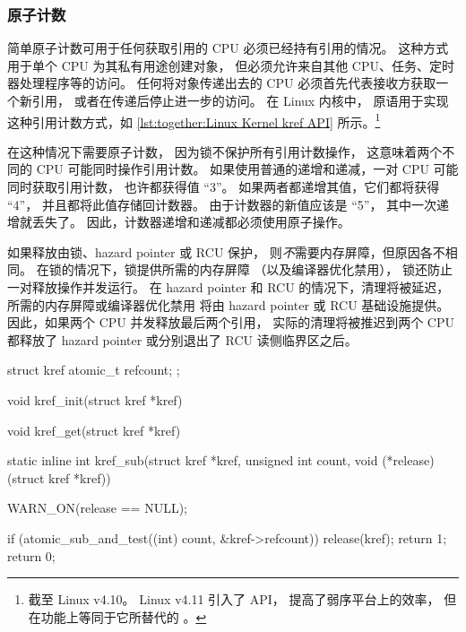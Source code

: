 \subsubsection{原子计数}
\label{sec:together:Atomic Counting}

简单原子计数可用于任何获取引用的 CPU
必须已经持有引用的情况。
这种方式用于单个 CPU 为其私有用途创建对象，
但必须允许来自其他 CPU、任务、定时器处理程序等的访问。
任何将对象传递出去的 CPU 必须首先代表接收方获取一个新引用，
或者在传递后停止进一步的访问。
在 Linux 内核中， 原语用于实现
这种引用计数方式，如
\cref{lst:together:Linux Kernel kref API} 所示。\footnote{
	截至 Linux v4.10。
	Linux v4.11 引入了  API，
	提高了弱序平台上的效率，
	但在功能上等同于它所替代的 。}

在这种情况下需要原子计数，
因为锁不保护所有引用计数操作，
这意味着两个不同的 CPU 可能同时操作引用计数。
如果使用普通的递增和递减，一对 CPU 可能同时获取引用计数，
也许都获得值 ``3''。
如果两者都递增其值，它们都将获得 ``4''，
并且都将此值存储回计数器。
由于计数器的新值应该是 ``5''，
其中一次递增就丢失了。
因此，计数器递增和递减都必须使用原子操作。

如果释放由锁、hazard pointer 或 RCU 保护，
则\emph{不}需要内存屏障，但原因各不相同。
在锁的情况下，锁提供所需的内存屏障
（以及编译器优化禁用），
锁还防止一对释放操作并发运行。
在 hazard pointer 和 RCU 的情况下，清理将被延迟，
所需的内存屏障或编译器优化禁用
将由 hazard pointer 或 RCU 基础设施提供。
因此，如果两个 CPU 并发释放最后两个引用，
实际的清理将被推迟到两个 CPU 都释放了 hazard pointer
或分别退出了 RCU 读侧临界区之后。

\QuickQuizEnd

\begin{listing}
\begin{fcvlabel}
\begin{VerbatimL}[commandchars=\\\[\]]
struct kref {						\lnlbl[kref:b]
	atomic_t refcount;
};							\lnlbl[kref:e]

void kref_init(struct kref *kref)										\lnlbl[init:e]

void kref_get(struct kref *kref)										\lnlbl[get:e]

static inline int					\lnlbl[sub:b]
kref_sub(struct kref *kref, unsigned int count,
         void (*release)(struct kref *kref))
{
	WARN_ON(release == NULL);

	if (atomic_sub_and_test((int) count,		\lnlbl[check]
	                        &kref->refcount)) {
		release(kref);				\lnlbl[rel]
		return 1;				\lnlbl[ret:1]
	}
	return 0;
}							\lnlbl[sub:e]
\end{VerbatimL}
\end{fcvlabel}
\caption{Linux 内核  API}
\label{lst:together:Linux Kernel kref API}
\end{listing}

